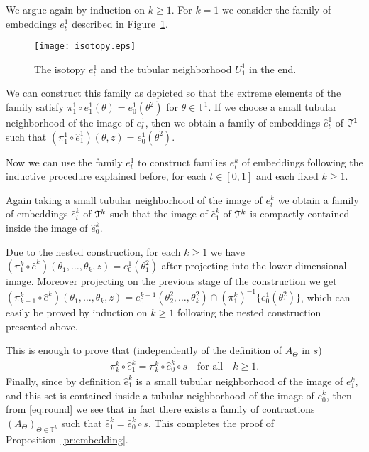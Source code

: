 \documentclass[reqno,12pt,a4paper]{amsart}
\theoremstyle{plain}
\theoremstyle{definition}
\begin{document}
We argue again by induction on $k\ge1$. For $k=1$ we
consider the family of embeddings $e^1_t$ described in
Figure~\ref{fig:isotopy}.

\begin{figure}[htpb]
  \centering
{}
  \texttt{[image: isotopy.eps]}
  \caption{\label{fig:isotopy} The isotopy $e^1_t$ and the
    tubular neighborhood $U^1_1$ in the end.}
\end{figure}

We can construct this family as depicted so that the extreme
elements of the family satisfy $\pi^1_1\circ
e_1^1(\theta)=e_0^1(\theta^2)$ for $\theta\in{{\mathbb T}}^1$.  If we
choose a small tubular neighborhood of the image of $e^1_t$,
then we obtain a family of embeddings $\hat e^1_t$ of
${\EuScript{T}}^1$ such that $(\pi^1_1\circ\hat e^1_1)(\theta,z)=
e^1_0(\theta^2)$.

Now we can use the family $e^1_t$ to construct families
$e^k_t$ of embeddings following the inductive procedure
explained before, for each $t\in[0,1]$ and each fixed
$k\ge1$.

Again taking a small tubular neighborhood of the image of
$e^k_t$ we obtain a family of embeddings $\hat e^k_t$ of
${\EuScript{T}}^k$ such that the image of $\hat e^k_1$ of ${\EuScript{T}}^k$ is
compactly contained inside the image of $\hat e^k_0$.

Due to the nested construction, for each $k\ge1$ we have $
(\pi^k_1\circ\hat e^k)(\theta_1,\dots,\theta_k,z)=
e^1_0(\theta_1^2) $ after projecting into the lower
dimensional image. Moreover projecting on the previous stage
of the construction we get $ (\pi^k_{k-1}\circ\hat
e^k)(\theta_1,\dots,\theta_k,z)=
e^{k-1}_0(\theta_2^2,\dots,\theta_{k}^2)
\cap(\pi^k_1)^{-1}\{e^1_0(\theta_1^2)\}$, which can easily
be proved by induction on $k\ge1$ following the nested
construction presented above.

This is enough to prove that (independently of the
definition of $A_\Theta$ in $s$)
\begin{align}\label{eq:round}
  \pi^k_k\circ \hat e^k_1 = \pi^k_k \circ \hat e^k_0\circ s
  \quad\text{for all}\quad k\ge1.
\end{align}
Finally, since by definition $\hat e^k_1$ is a small tubular
neighborhood of the image of $e^k_1$, and this set is
contained inside a tubular neighborhood of the image of
$e^k_0$, then from \eqref{eq:round} we see that in fact
there exists a family of contractions
$(A_\Theta)_{\Theta\in{{\mathbb T}}^k}$ such that $\hat e^k_1=\hat
e^k_0\circ s$. This completes the proof of
Proposition~\ref{pr:embedding}.
\end{document}
